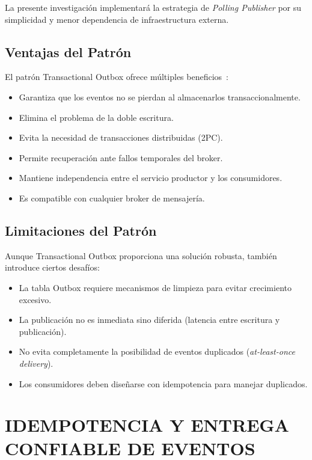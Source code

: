 La presente investigación implementará la estrategia de \textit{Polling Publisher} por su simplicidad y menor dependencia de infraestructura externa.

\subsection{Ventajas del Patrón}

El patrón Transactional Outbox ofrece múltiples beneficios~\parencite{richardson2018}:

\begin{itemize}
    \item Garantiza que los eventos no se pierdan al almacenarlos transaccionalmente.
    \item Elimina el problema de la doble escritura.
    \item Evita la necesidad de transacciones distribuidas (2PC).
    \item Permite recuperación ante fallos temporales del broker.
    \item Mantiene independencia entre el servicio productor y los consumidores.
    \item Es compatible con cualquier broker de mensajería.
\end{itemize}

\subsection{Limitaciones del Patrón}

Aunque Transactional Outbox proporciona una solución robusta, también introduce ciertos desafíos:

\begin{itemize}
    \item La tabla Outbox requiere mecanismos de limpieza para evitar crecimiento excesivo.
    \item La publicación no es inmediata sino diferida (latencia entre escritura y publicación).
    \item No evita completamente la posibilidad de eventos duplicados (\textit{at-least-once delivery}).
    \item Los consumidores deben diseñarse con idempotencia para manejar duplicados.
\end{itemize}

\section{IDEMPOTENCIA Y ENTREGA CONFIABLE DE EVENTOS}

